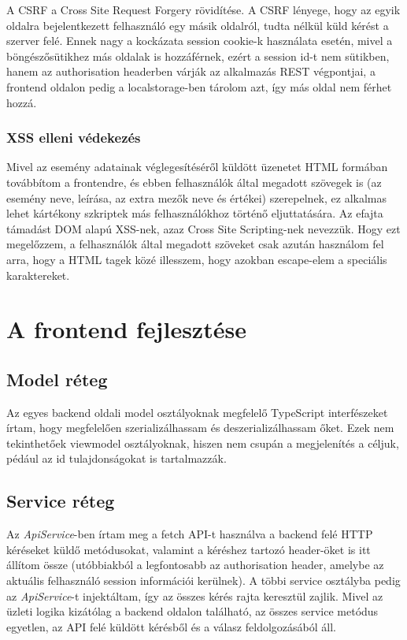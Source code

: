 \documentclass[a4paper,12pt]{report}
\theoremstyle{definition}
\theoremstyle{remark}
\begin{document}
A CSRF a Cross Site Request Forgery rövidítése. A CSRF lényege, hogy az egyik oldalra bejelentkezett felhasználó egy másik oldalról, tudta nélkül küld kérést a szerver felé\cite{Infbiztwebsite}. Ennek nagy a kockázata session cookie-k használata esetén, mivel a böngészősütikhez más oldalak is hozzáférnek, ezért a session id-t nem sütikben, hanem az authorisation headerben várják az alkalmazás REST végpontjai, a frontend oldalon pedig a localstorage-ben tárolom azt, így más oldal nem férhet hozzá.


	\subsection{XSS elleni védekezés}

Mivel az esemény adatainak véglegesítéséről küldött üzenetet HTML formában továbbítom a frontendre, és ebben felhasználók által megadott szövegek is (az esemény neve, leírása, az extra mezők neve és értékei) szerepelnek, ez alkalmas lehet kártékony szkriptek más felhasználókhoz történő eljuttatására. Az efajta támadást DOM alapú XSS-nek, azaz Cross Site Scripting-nek nevezzük\cite{Infbiztwebsite}. Hogy ezt megelőzzem, a felhasználók által megadott szöveket csak azután használom fel arra, hogy a HTML tagek közé illesszem, hogy azokban escape-elem a speciális karaktereket.

\chapter{A frontend fejlesztése}

\section{Model réteg}

Az egyes backend oldali model osztályoknak megfelelő TypeScript interfészeket írtam, hogy megfelelően szerializálhassam és deszerializálhassam őket. Ezek nem tekinthetőek viewmodel\cite{Viewmodelwebsite} osztályoknak, hiszen nem csupán a megjelenítés a céljuk, pédául az id tulajdonságokat is tartalmazzák.

\section{Service réteg}

Az \textit{ApiService}-ben írtam meg a fetch API-t\cite{Fetchwebsite} használva a backend felé HTTP kéréseket küldő metódusokat, valamint a kéréshez tartozó header-öket is itt állítom össze (utóbbiakból a legfontosabb az authorisation header, amelybe az aktuális felhasználó session információi kerülnek). A többi service osztályba pedig az \textit{ApiService}-t injektáltam, így az összes kérés rajta keresztül zajlik.  Mivel az üzleti logika kizátólag a backend oldalon található, az összes service metódus egyetlen, az API felé küldött kérésből és a válasz feldolgozásából áll.
\end{document}
